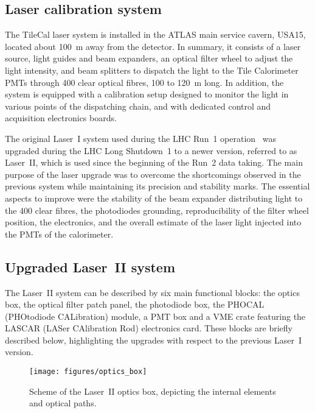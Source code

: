 \subsection{Laser calibration system}

The TileCal laser system is installed in the ATLAS main service cavern, USA15, located about 100~m away from the detector. In summary, it consists of a laser source, light guides and beam expanders, an optical filter wheel to adjust the light intensity, and beam splitters to dispatch the light to the Tile Calorimeter PMTs through 400 clear optical fibres, 100 to 120~m long. In addition, the system is equipped with a calibration setup designed to monitor the light in various points of the dispatching chain, and with dedicated control and acquisition electronics boards.

The original Laser~I system used during the LHC Run~1 operation~\cite{bib:laser_run_1} was upgraded during the LHC Long Shutdown~1 to a newer version, referred to as Laser~II, which is used since the beginning of the Run~2 data taking. The main purpose of the laser upgrade was to overcome the shortcomings observed in the previous system while maintaining its precision and stability marks. The essential aspects to improve were the stability of the beam expander distributing light to the 400 clear fibres, the photodiodes grounding, reproducibility of the filter wheel position, the electronics, and the overall estimate of the laser light injected into the PMTs of the calorimeter.


\subsection{Upgraded Laser~II system}

The Laser~II system can be described by six main functional blocks: the optics box, the optical filter patch panel, the photodiode box, the PHOCAL (PHOtodiode CALibration) module, a PMT box and a VME crate featuring the LASCAR (LASer CAlibration Rod) electronics card. These blocks are briefly described below, highlighting the upgrades with respect to the previous Laser~I version.


\begin{figure}[htbp]
\begin{center}
    \texttt{[image: figures/optics\_box]}
    \caption{Scheme of the Laser~II optics box, depicting the internal elements and optical paths.}\label{fig:optics_box}
\end{center}
\end{figure}

